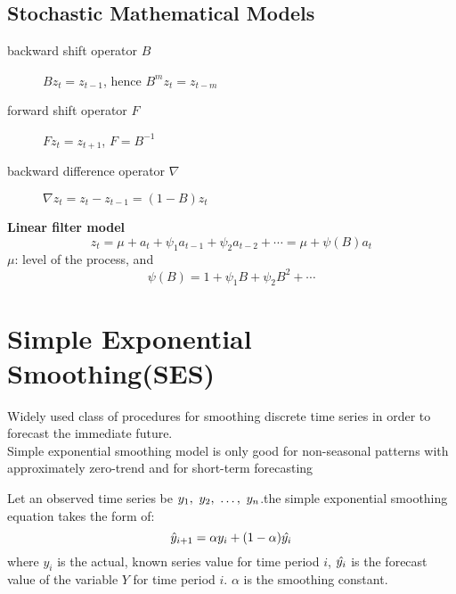 \documentclass{article}
\begin{document}
\subsection{Stochastic Mathematical Models}
\begin{description}
\item [backward shift operator $B$] $Bz_t = z_{t-1}$, hence $B^m z_t = z_{t-m}$
\item [forward shift operator $F$] $Fz_t = z_{t+1}$, $F = B^{-1}$
\item [backward difference operator $\nabla$] $\nabla z_t = z_t - z_{t-1} = (1-B)z_t$
\end{description}

\textbf{Linear filter model}\\
$$z_t = \mu + a_t + \psi_1 a_{t-1} + \psi_2 a_{t-2} + \cdots = \mu + \psi(B) a_t$$
$\mu$: level of the process, and
$$\psi(B) = 1 + \psi_1 B + \psi_2 B^2 + \cdots$$

\section{Simple Exponential Smoothing(SES)}
Widely used class of procedures for smoothing discrete time series in order to forecast the immediate future.\\
Simple exponential smoothing model is only good for non-seasonal patterns with approximately zero-trend and for short-term forecasting

Let an observed time series be $y_1,~y_2,~\ldots,~y_n$.the simple exponential smoothing equation takes the form of:
$$\hat{y}_{i+1} = \alpha y_i + (1 - \alpha) \hat{y_i} $$
where $y_i$ is the actual, known series value for time period $i$, $\hat{y_i}$ is the forecast value of the variable $Y$ for time period $i$.
$\alpha$ is the smoothing constant.
\end{document}
